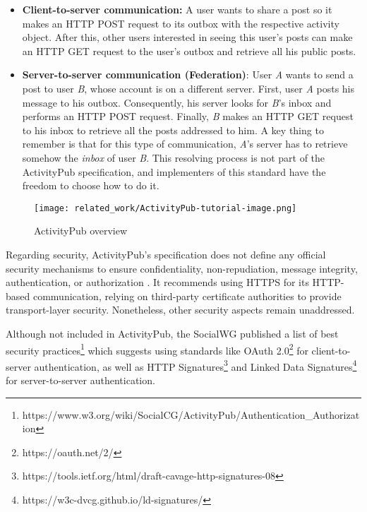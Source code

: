\begin{itemize}
  \item \textbf{Client-to-server communication:} A user wants to share a post so it makes an HTTP POST request to its outbox with the respective activity object. After this, other users interested in seeing this user's posts can make an HTTP GET request to the user's outbox and retrieve all his public posts.
  \item \textbf{Server-to-server communication (Federation)}: User \emph{A} wants to send a post to user \emph{B}, whose account is on a different server. First, user \emph{A} posts his message to his outbox. Consequently, his server looks for \emph{B}'s inbox and performs an HTTP POST request. Finally, \emph{B} makes an HTTP GET request to his inbox to retrieve all the posts addressed to him. A key thing to remember is that for this type of communication, \emph{A}'s server has to retrieve somehow the \emph{inbox} of user \emph{B}. This resolving process is not part of the ActivityPub specification, and implementers of this standard have the freedom to choose how to do it. 
\end{itemize}
 



\begin{figure}[H]
  \centering
  \texttt{[image: related\_work/ActivityPub-tutorial-image.png]}
  \caption{ActivityPub overview \cite{lemmer-webber_tallon_guy_prodromou_2018}}
  \label{fig:ap_flow}
\end{figure}
\pagebreak

Regarding security, ActivityPub's specification does not define any official security mechanisms to ensure confidentiality, non-repudiation, message integrity, authentication, or authorization \cite{lemmer-webber_tallon_guy_prodromou_2018}. It recommends using HTTPS for its HTTP-based communication, relying on third-party certificate authorities to provide transport-layer security. Nonetheless, other security aspects remain unaddressed. 


Although not included in ActivityPub, the SocialWG published a list of best security practices\footnote{https://www.w3.org/wiki/SocialCG/ActivityPub/Authentication\_Authorization} which suggests using standards like OAuth 2.0\footnote{https://oauth.net/2/} for client-to-server authentication, as well as HTTP Signatures\footnote{https://tools.ietf.org/html/draft-cavage-http-signatures-08} and Linked Data Signatures\footnote{https://w3c-dvcg.github.io/ld-signatures/} for server-to-server authentication.

